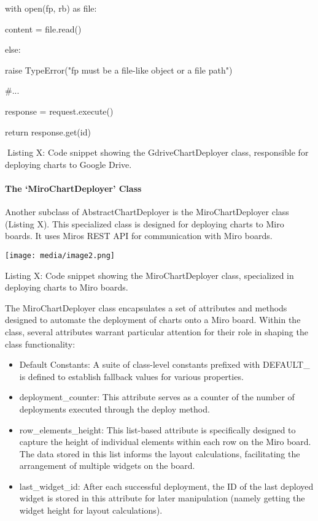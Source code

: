 \documentclass[
]{article}
\begin{document}
with open(fp, \textquotesingle rb\textquotesingle) as file:

content = file.read()

else:

raise TypeError("fp must be a file-like object or a file path")

\#...

response = request.execute()

return response.get(\textquotesingle id\textquotesingle)

Listing X: Code snippet showing the GdriveChartDeployer class,
responsible for deploying charts to Google Drive.

\paragraph{The `MiroChartDeployer'
Class}\label{the-mirochartdeployer-class}

Another subclass of AbstractChartDeployer is the MiroChartDeployer class
(Listing X). This specialized class is designed for deploying charts to
Miro boards. It uses Miro\textquotesingle s REST API for communication
with Miro boards.

\texttt{[image: media/image2.png]}

Listing X: Code snippet showing the MiroChartDeployer class, specialized
in deploying charts to Miro boards.

The MiroChartDeployer class encapsulates a set of attributes and methods
designed to automate the deployment of charts onto a Miro board. Within
the class, several attributes warrant particular attention for their
role in shaping the class functionality:

\begin{itemize}
\item
  Default Constants: A suite of class-level constants prefixed with
  DEFAULT\_ is defined to establish fallback values for various
  properties.
\item
  deployment\_counter: This attribute serves as a counter of the number
  of deployments executed through the deploy method.
\item
  row\_elements\_height: This list-based attribute is specifically
  designed to capture the height of individual elements within each row
  on the Miro board. The data stored in this list informs the layout
  calculations, facilitating the arrangement of multiple widgets on the
  board.
\item
  last\_widget\_id: After each successful deployment, the ID of the last
  deployed widget is stored in this attribute for later manipulation
  (namely getting the widget height for layout calculations).
\end{itemize}
\end{document}

